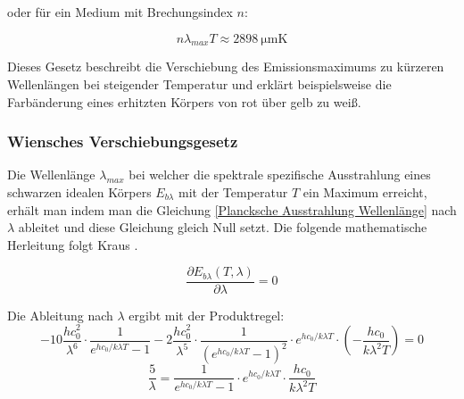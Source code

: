 \documentclass[12pt,a4paper]{article}
\begin{document}
oder für ein Medium mit Brechungsindex $n$:

\begin{equation}
  n\lambda_{max} T \approx \SI{2898}{\micro\meter\kelvin}
\end{equation}

Dieses Gesetz beschreibt die Verschiebung des Emissionsmaximums zu kürzeren Wellenlängen bei steigender Temperatur 
und erklärt beispielsweise die Farbänderung eines erhitzten Körpers von rot über gelb zu weiß.

\fi

\subsubsection{Wiensches Verschiebungsgesetz}
Die Wellenlänge $\lambda_{max}$ bei welcher die spektrale spezifische Ausstrahlung eines schwarzen idealen Körpers $E_{b\lambda}$ 
mit der Temperatur $T$ ein Maximum erreicht, erhält man indem man die Gleichung \eqref{Plancksche Ausstrahlung Wellenlänge} nach 
$\lambda$ ableitet und diese Gleichung gleich Null setzt. Die folgende mathematische Herleitung folgt Kraus \cite[S.101]{kraus2007atmosphäre}.

\begin{equation*}
  \frac{\partial E_{b\lambda}(T, \lambda)}{\partial \lambda} = 0
\end{equation*}

Die Ableitung nach $\lambda$ ergibt mit der Produktregel:
\begin{equation*}
  -10 \frac{hc_0^2}{\lambda^6} \cdot \frac{1}{e^{hc_0/k\lambda T} - 1} 
- 2 \frac{hc_0^2}{\lambda^5} \cdot \frac{1}{\left(e^{hc_0/k\lambda T} - 1\right)^2} \cdot e^{hc_0/k\lambda T} \cdot (-\frac{hc_0}{k\lambda^2 T}) = 0
\end{equation*}
\begin{equation*}
  \frac{5}{\lambda} = \frac{1}{e^{hc_0/k\lambda T}-1} \cdot e^{hc_0/k\lambda T} \cdot \frac{hc_0}{k\lambda^2T}
\end{equation*}
\end{document}
